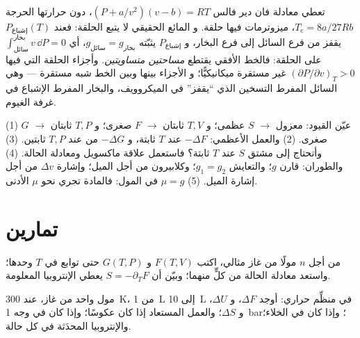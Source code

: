 \begin{remark}\label{rem:b2:thermodynamic-potentials:maxwellconstruction}
تعطي معادلة فان دير فالس $(P + a/v^2)(v - b) = RT$، دون
حرارتها الحرجة $T_{\text{c}} = 8a/27Rb$، ميزوترمات فيها حلقة. و
المائع الحقيقي لا يتبع الحلقة: فعند $P_{\text{إشباع}}(T)$ يقفز من
فرع السائل إلى فرع البخار، و $P_{\text{إشباع}}$ يثبّته $g_{\text{سائل}}
= g_{\text{بخار}}$، أي $\int_{\text{سائل}}^{\text{بخار}}v\,\dd P = 0$ على
الحلقة: فالخط الأفقي يقتطع \emph{مساحتين متساويتين}. وأجزاء
الحلقة التي فيها $(\partial P/\partial v)_T > 0$ غير مستقرة ميكانيكيًّا؛ و
الأجزاء بينها وبين الخط شبه مستقرة --- وهي السائل المفرط التسخين
الذي ``يقفز'' في الميكروويف، والبخار المفرط الإشباع في
غرفة الغيوم.
\end{remark}

\begin{method}\label{meth:b2:thermodynamic-potentials:method}
(1) عيّن القيود: معزول $\to$ $S$ عظمى؛ و $T,V$ ثابتان $\to$
$F$ صغرى؛ و $T,P$ ثابتان $\to$ $G$ صغرى. (2) والعمل الأعظمي: $-\Delta F$ عند $T$
ثابتة، و $-\Delta G$ من  عند $T,P$ ثابتين. (3) وأتحتاج إلى مشتق
$S$ عند $T$ ثابتة؟ فاستعمل علاقة ماكسويل ومعادلة الحالة.
(4) والطوران: قارن $g$؛ والتعايش $g_1 = g_2$؛ وكلابيرون من أجل
الميل؛ وإشارة $\Delta v$ من أجل إشارة الميل. (5) 
$\mu = g$ في المول: فالمادة تجري نحو $\mu$ الأدنى.
\end{method}

\section{تمارين}

\begin{exercise}[$\star$]\label{exo:b2:thermodynamic-potentials:1}
من أجل $n$ مولًا من غاز مثالي، اكتب $F(T,V)$ و $G(T,P)$ حتى
توابع في $T$ وحدها؛ واستعد معادلة الحالة من كلٍّ منهما؛ وبيّن
أن $S = -\partial_TF$ يعطي الإنتروبيا المعلومة.
\end{exercise}

\begin{exercise}[$\star$]\label{exo:b2:thermodynamic-potentials:2}
مول واحد من غاز، عند \qty{300}{K}، من \qty{1}{L} إلى \qty{10}{L} في
منظِّم حراري: أوجد $\Delta F$، و $\Delta U$، و $\Delta S$؛ والعمل المستعاد إذا كان عكوسًا؛
وإذا كان في وجه \qty{1}{bar}؛ وإذا كان في الخلاء؛ والإنتروبيا المحدَثة في كل
حالة.
\end{exercise}

